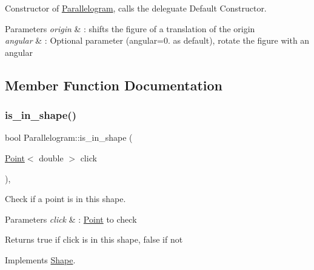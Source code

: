 Constructor of \hyperlink{classParallelogram}{Parallelogram}, calls the deleguate Default Constructor. 


\begin{DoxyParams}{Parameters}
{\em origin} & \+: shifts the figure of a translation of the origin \\
\hline
{\em angular} & \+: Optional parameter (angular=0. as default), rotate the figure with an angular \\
\hline
\end{DoxyParams}


\subsection{Member Function Documentation}
\mbox{\label{classParallelogram_a9ba441d86d6311bba489e998c87dddf6}} 
\subsubsection{\texorpdfstring{is\+\_\+in\+\_\+shape()}{is\_in\_shape()}}
{\footnotesize\ttfamily bool Parallelogram\+::is\+\_\+in\+\_\+shape (\begin{DoxyParamCaption}\item[{\hyperlink{classPoint}{Point}$<$ double $>$}]{click }\end{DoxyParamCaption})\hspace{0.3cm}{\ttfamily [override]}, {\ttfamily [virtual]}}



Check if a point is in this shape. 


\begin{DoxyParams}{Parameters}
{\em click} & \+: \hyperlink{classPoint}{Point} to check \\
\hline
\end{DoxyParams}
\begin{DoxyReturn}{Returns}
true if click is in this shape, false if not 
\end{DoxyReturn}


Implements \hyperlink{classShape_abcce23128cd35989468a88a7194152af}{Shape}.

\mbox{\label{classParallelogram_a982287c8d16ec47951db62b07eb77feb}} 
